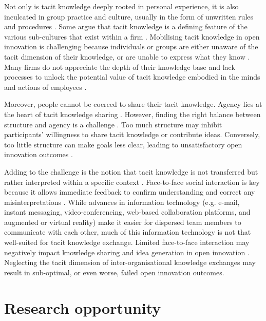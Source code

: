 Not only is tacit knowledge deeply rooted in personal experience, it is also inculcated in group practice and culture, usually in the form of unwritten rules and procedures \citep{nonaka1995knowledge,howells1996tacit}. Some argue that tacit knowledge is a defining feature of the various sub-cultures that exist within a firm \citep[e.g.][]{smith2001role,munoz2015tacit}. Mobilising tacit knowledge in open innovation is challenging because individuals or groups are either unaware of the tacit dimension of their knowledge, or are unable to express what they know \citep{polanyi1966tacit}. Many firms do not appreciate the depth of their knowledge base and lack processes to unlock the potential value of tacit knowledge embodied in the minds and actions of employees \citep{nonaka1994dynamic,howells1996tacit,horvath2000working}. \medskip

Moreover, people cannot be coerced to share their tacit knowledge. Agency lies at the heart of tacit knowledge sharing \citep{polanyi1966tacit, emirbayer1994network}. However, finding the right balance between structure and agency is a challenge \citep{davis2010agency}. Too much structure may inhibit participants' willingness to share tacit knowledge or contribute ideas. Conversely, too little structure can make goals less clear, leading to unsatisfactory open innovation outcomes \citep{lam2000tacit}. \medskip

Adding to the challenge is the notion that tacit knowledge is not transferred but rather interpreted within a specific context \citep{nonaka1995knowledge,duguid2005art,marabelli2014knowing,zhang2020extended}. Face-to-face social interaction is key because it allows immediate feedback to confirm understanding and correct any misinterpretations \citep{haldin2000difficulties,gertler2003tacit,koskinen2003tacit}. While advances in information technology (e.g. e-mail, instant messaging, video-conferencing, web-based collaboration platforms, and augmented or virtual reality) make it easier for dispersed team members to communicate with each other, much of this information technology is not that well-suited for tacit knowledge exchange. Limited face-to-face interaction may negatively impact knowledge sharing and idea generation in open innovation \citep{johannessen2001mismanagement}. Neglecting the tacit dimension of inter-organisational knowledge exchanges may result in sub-optimal, or even worse, failed open innovation outcomes. 

\section{Research opportunity}

